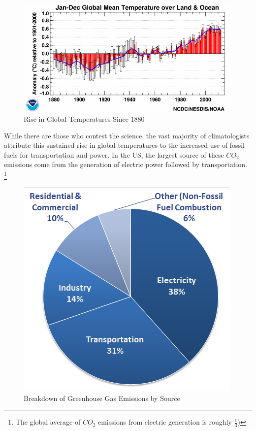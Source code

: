 \documentclass[12pt]{article}
\begin{document}
\begin{figure}[H]
	\begin{center}
	\includegraphics[scale = .4]{meantemp.png}
	\caption{Rise in Global Temperatures Since 1880 \cite{Temps}}
	\end{center}
\end{figure}

While there are those who contest the science, the vast majority of climatologists attribute this sustained rise in global temperatures to the increased use of fossil fuels for transportation and power. In the US, the largest source of these $CO_{2}$ emissions come from the generation of electric power followed by transportation. \footnote{The global average of $CO_{2}$ emissions from electric generation is roughly $\frac{1}{3}$)}

\begin{figure}[H]
	\begin{center}
	\includegraphics[scale = .4]{gases-co2.png}
	\caption{Breakdown of Greenhouse Gas Emissions by Source \cite{co2}}
	\end{center}
\end{figure}
\end{document}
